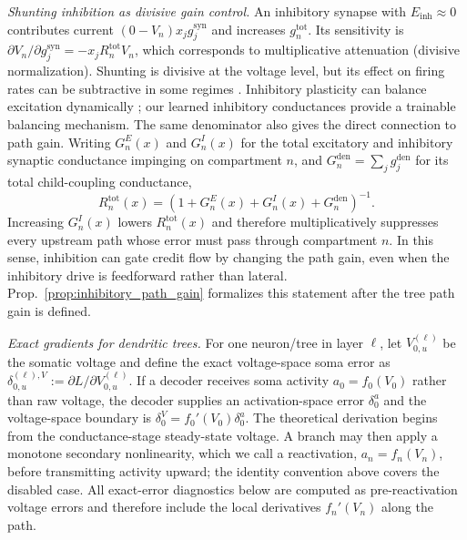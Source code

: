     \noindent\emph{Shunting inhibition as divisive gain control.}
    An inhibitory synapse with $E_{\mathrm{inh}}\!\approx\!0$ contributes current $(0{-}V_n)x_j g_j^{\mathrm{syn}}$ and increases $g_n^{\mathrm{tot}}$.
    Its sensitivity is $\partial V_n / \partial g_j^{\mathrm{syn}} = -x_j R_n^{\mathrm{tot}} V_n$, which corresponds to multiplicative attenuation (divisive normalization).
    Shunting is divisive at the voltage level, but its effect on firing rates can be subtractive in some regimes \cite{holt1997shunting}.
    Inhibitory plasticity can balance excitation dynamically \cite{vogels2011inhibitory}; our learned inhibitory conductances provide a trainable balancing mechanism.
    The same denominator also gives the direct connection to path gain. Writing $G_n^E(x)$ and $G_n^I(x)$ for the total excitatory and inhibitory synaptic conductance impinging on compartment $n$, and $G_n^{\mathrm{den}}=\sum_jg_j^{\mathrm{den}}$ for its total child-coupling conductance,
    \[
    R_n^{\mathrm{tot}}(x)=\left(1+G_n^E(x)+G_n^I(x)+G_n^{\mathrm{den}}\right)^{-1}.
    \]
    Increasing $G_n^I(x)$ lowers $R_n^{\mathrm{tot}}(x)$ and therefore multiplicatively suppresses every upstream path whose error must pass through compartment $n$.
    In this sense, inhibition can gate credit flow by changing the path gain, even when the inhibitory drive is feedforward rather than lateral. Prop.~\ref{prop:inhibitory_path_gain} formalizes this statement after the tree path gain is defined.
    
    \noindent\emph{Exact gradients for dendritic trees.}
    For one neuron/tree in layer $\ell$, let $V_{0,u}^{(\ell)}$ be the somatic voltage and define the exact voltage-space soma error as $\delta_{0,u}^{(\ell),V}:=\partial L/\partial V_{0,u}^{(\ell)}$.
    If a decoder receives soma activity $a_0=f_0(V_0)$ rather than raw voltage, the decoder supplies an activation-space error $\delta_0^a$ and the voltage-space boundary is $\delta_0^V=f_0'(V_0)\delta_0^a$.
    The theoretical derivation begins from the conductance-stage steady-state voltage. A branch may then apply a monotone secondary nonlinearity, which we call a reactivation, $a_n=f_n(V_n)$, before transmitting activity upward; the identity convention above covers the disabled case. All exact-error diagnostics below are computed as pre-reactivation voltage errors and therefore include the local derivatives $f_n'(V_n)$ along the path.
    
